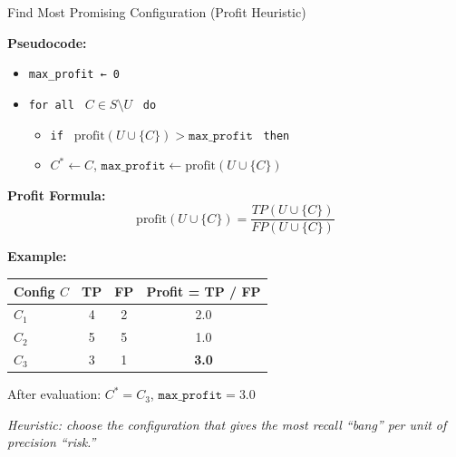 \documentclass[8pt]{beamer} %
\begin{document}
\begin{frame}{Find Most Promising Configuration (Profit Heuristic)}
	
	\vspace{0.5em}
	\textbf{Pseudocode:}
	\begin{itemize}
		\item[] \texttt{max\_profit ← 0}
		\item[] \texttt{for all } $C \in S \setminus U$ \texttt{ do}
		\begin{itemize}
			\item[] \texttt{if } $\text{profit}(U \cup \{C\}) > \texttt{max\_profit}$ \texttt{ then}
			\item[] \quad $C^* \leftarrow C$, $\texttt{max\_profit} \leftarrow \text{profit}(U \cup \{C\})$
		\end{itemize}
	\end{itemize}
	
	\vspace{0.5em}
	\textbf{Profit Formula:}
	$$
	\text{profit}(U \cup \{C\}) = \frac{TP(U \cup \{C\})}{FP(U \cup \{C\})}
	$$
	
	\vspace{0.5em}
	\textbf{Example:}
	\begin{tabular}{lccc}
		\textbf{Config $C$} & \textbf{TP} & \textbf{FP} & \textbf{Profit = TP / FP} \\
		\hline
		$C_1$ & 4 & 2 & 2.0 \\
		$C_2$ & 5 & 5 & 1.0 \\
		$C_3$ & 3 & 1 & \textbf{3.0} \\
	\end{tabular}
	
	\vspace{0.5em}
	After evaluation: $C^* = C_3$, $\texttt{max\_profit} = 3.0$
	
	\vspace{0.5em}
	\textit{Heuristic: choose the configuration that gives the most recall “bang” per unit of precision “risk.”}
\end{frame}
\end{document}
